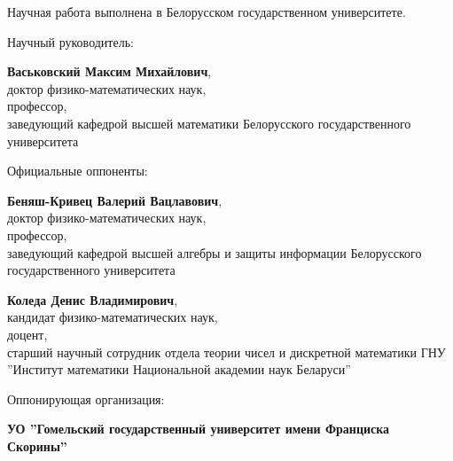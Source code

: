 \documentclass[_00_autoref.tex]{subfiles}
\begin{document}
\pagestyle{empty}
\setlength{\voffset}{-18mm}
\noindent Научная работа выполнена в Белорусском государственном университете.

\bigskip
\noindent
\begin{minipage}[t]{0.38\textwidth}
  \begin{flushleft}
    Научный руководитель:
  \end{flushleft}
\end{minipage}
\begin{minipage}[t]{0.61\textwidth}
    \begin{flushleft}
        \textbf{Васьковский Максим Михайлович},\\
        доктор физико-математических наук,\\
        профессор,\\
        заведующий кафедрой высшей математики Белорусского государственного университета
    \end{flushleft}
\end{minipage}

\bigskip
\noindent
\begin{minipage}[t]{0.38\textwidth}
    \begin{flushleft}
        Официальные оппоненты:
    \end{flushleft}
\end{minipage}
\begin{minipage}[t]{0.61\textwidth}
    \begin{flushleft}
        \textbf{Беняш-Кривец Валерий Вацлавович},\\
        доктор физико-математических наук,\\
        профессор,\\
        заведующий кафедрой высшей алгебры и защиты информации Белорусского государственного университета

        \textbf{Коледа Денис Владимирович},\\
        кандидат физико-математических наук,\\
        доцент,\\
        старший научный сотрудник отдела теории чисел и дискретной математики ГНУ ''Институт математики Национальной академии наук Беларуси''
  \end{flushleft}
\end{minipage}

\bigskip
\noindent
\begin{minipage}[t]{0.38\textwidth}
    \begin{flushleft}
        Оппонирующая организация:
    \end{flushleft}
\end{minipage}
\begin{minipage}[t]{0.61\textwidth}
    \begin{flushleft}
        \textbf{УО ''Гомельский государственный университет имени Франциска Скорины''}
    \medskip
  \end{flushleft}
\end{minipage}
\end{document}
